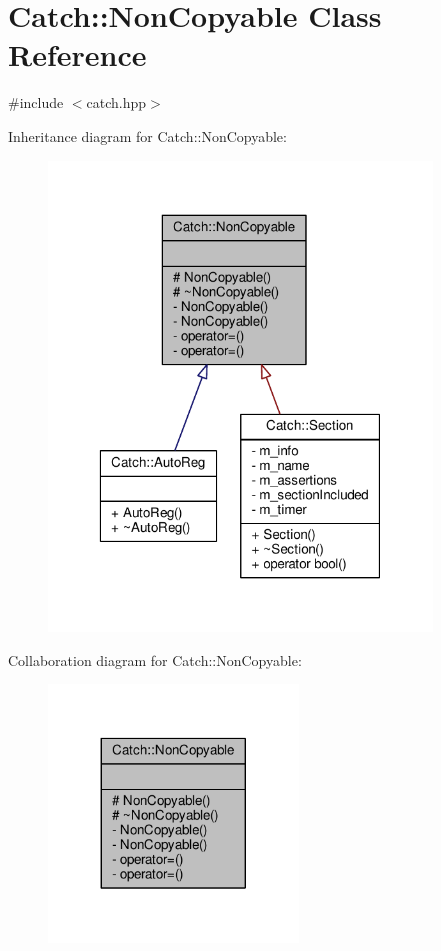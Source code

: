 \hypertarget{class_catch_1_1_non_copyable}{\section{Catch\-:\-:Non\-Copyable Class Reference}
\label{class_catch_1_1_non_copyable}
}


{\ttfamily \#include $<$catch.\-hpp$>$}



Inheritance diagram for Catch\-:\-:Non\-Copyable\-:
\nopagebreak
\begin{figure}[H]
\begin{center}
\leavevmode
\includegraphics[width=289pt]{class_catch_1_1_non_copyable__inherit__graph}
\end{center}
\end{figure}


Collaboration diagram for Catch\-:\-:Non\-Copyable\-:
\nopagebreak
\begin{figure}[H]
\begin{center}
\leavevmode
\includegraphics[width=188pt]{class_catch_1_1_non_copyable__coll__graph}
\end{center}
\end{figure}
